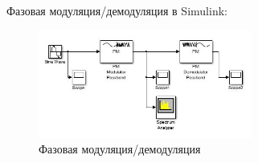 \documentclass[10pt,a4paper]{article}
\begin{document}
Фазовая модуляция/демодуляция в Simulink:
\begin{figure}[h]\centering
    \includegraphics[width=7cm]{sim_p} 
    \caption{Фазовая модуляция/демодуляция}\label{fig.sim_p}
\end{figure}                                                                                                                                                                                                                                                                                                                                                                                                                                                                                                                                                                                                                                                                                                                                                                                                                                                                                                                                                                                                                                                                                                                                                                                                                                                                                                                                                                                                                                                                       
\end{document}
